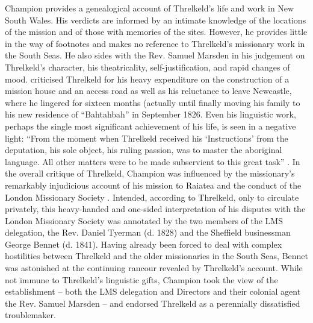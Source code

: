 Champion provides a genealogical account of Threlkeld’s life and work in New South Wales. His verdicts are informed by an intimate knowledge of the locations of the mission and of those with memories of the sites. However, he provides little in the way of footnotes and makes no reference to Threlkeld’s missionary work in the South Seas. He also sides with the Rev. Samuel Marsden in his judgement on Threlkeld’s character, his theatricality, self-justification, and rapid changes of mood. \citet[327]{champion_lancelot_1939} criticised Threlkeld for his heavy expenditure on the construction of a mission house and an access road as well as his reluctance to leave Newcastle, where he lingered for sixteen months (actually until finally moving his family to his new residence of “Bahtahbah” in September 1826. Even his linguistic work, perhaps the single most significant achievement of his life, is seen in a negative light: “From the moment when Threlkeld received his ‘Instructions’ from the deputation, his sole object, his ruling passion, was to master the aboriginal language. All other matters were to be made subservient to this great task” \citep[317]{champion_lancelot_1939}. In the overall critique of Threlkeld, Champion was influenced by the missionary’s remarkably injudicious account of his mission to Raiatea and the conduct of the London Missionary Society \citep{threlkeld_statement_1828}. Intended, according to Threlkeld, only to circulate privately, this heavy-handed and one-sided interpretation of his disputes with the London Missionary Society was annotated by the two members of the LMS delegation, the Rev. Daniel Tyerman (d. 1828) and the Sheffield businessman George Bennet (d. 1841). Having already been forced to deal with complex hostilities between Threlkeld and the older missionaries in the South Seas, Bennet was astonished at the continuing rancour revealed by Threlkeld’s account. While not immune to Threlkeld’s linguistic gifts, Champion took the view of the establishment -- both the LMS delegation and Directors and their colonial agent the Rev. Samuel Marsden -- and endorsed Threlkeld as a perennially dissatisfied troublemaker.

